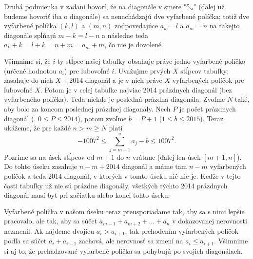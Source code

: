 {Druhá podmienka v zadaní hovorí, že na diagonále v smere "$\searrow\kern-10pt\nwarrow$" (ďalej už budeme hovoriť iba o diagonále) sa nenachádzajú dve vyfarbené políčka; totiž dve vyfarbené políčka $(k,l)$ a $(m,n)$ zodpovedajúce $a_k=l$ a $a_m=n$ na takejto diagonále spĺňajú $m-k=l-n$ a následne teda $a_k+k=l+k=n+m=a_m+m$, čo nie je dovolené.

Všimnime si, že $i$-ty stĺpec našej tabuľky obsahuje práve jedno vyfarbené políčko (určené hodnotou $a_i$) pre ľubovoľné $i$. Uvažujme prvých $X$ stĺpcov tabuľky; zasahuje do nich $X+2014$ diagonál a je v nich práve $X$ vyfarbených políčok pre ľubovoľné $X$. Potom je v celej tabuľke najviac 2014 prázdnych diagonál (bez vyfarbeného políčka). Teda niekde je posledná prázdna diagonála. Zvoľme $N$ také, aby bolo za koncom poslednej prázdnej diagonály. Nech $P$ je počet prázdnych diagonál (\tj. $0\le P\le 2014$), potom zvoľme $b=P+1$ ($1\le b\le 2015$). Teraz ukážeme, že pre každé $n>m\ge N$ platí
$$
-1007^2\le\sum_{j=m+1}^n a_j-b\le 1007^2.
$$
Pozrime sa na úsek stĺpcov od $m+1$ do $n$ vrátane (ďalej len úsek $[m+1,n]$). Do tohto úseku zasahuje $n-m+2014$ diagonál a máme tam $n-m$ vyfarbených políčok a teda 2014 diagonál, v ktorých v tomto úseku nič nie je. Keďže v tejto časti tabuľky už nie sú prázdne diagonály, všetkých týchto 2014 prázdnych diagonál musí byť pri začiatku alebo konci tohto úseku.

Vyfarbené políčka v našom úseku teraz preusporiadame tak, aby sa s nimi lepšie pracovalo, ale tak, aby sa súčet $a_{m+1}+a_{m+2}+\dots +a_n$ v dokazovanej nerovnosti nezmenil. Ak nájdeme dvojicu $a_i>a_{i+1}$, tak prehodením vyfarbených políčok podľa \obr{} sa súčet $a_i+a_{i+1}$ zachová, ale nerovnosť sa zmení na $a_i\le a_{i+1}$. Všimnime si aj to, že prehadzované vyfarbené políčka sa pohybujú po svojich diagonálach.
%

}
